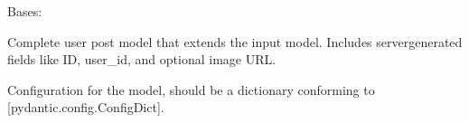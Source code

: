 \documentclass[letterpaper,10pt,openany,oneside,english]{sphinxmanual}
\begin{document}
\begin{savenotes}\begin{fulllineitems}

\pysigstartsignatures
{}
\pysigstopsignatures
\sphinxAtStartPar
Bases: 

\sphinxAtStartPar
Complete user post model that extends the input model.
Includes server\sphinxhyphen{}generated fields like ID, user\_id, and optional image URL.


\begin{savenotes}\begin{fulllineitems}

\pysigstartsignatures
{}
\pysigstopsignatures
\end{fulllineitems}\end{savenotes}



\begin{savenotes}\begin{fulllineitems}

\pysigstartsignatures
{}
\pysigstopsignatures
\end{fulllineitems}\end{savenotes}



\begin{savenotes}\begin{fulllineitems}

\pysigstartsignatures
{}
\pysigstopsignatures
\sphinxAtStartPar
Configuration for the model, should be a dictionary conforming to {[}\sphinxtitleref{ConfigDict}{]}{[}pydantic.config.ConfigDict{]}.


\end{fulllineitems}
\end{savenotes}
\end{fulllineitems}
\end{savenotes}
\end{document}
